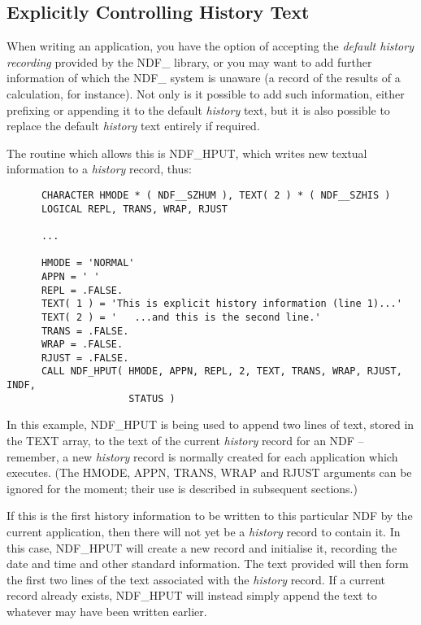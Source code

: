 \documentclass[twoside,11pt]{article}
\newcommand{\htmlref}[2]{#1}
\newcommand{\xlabel}[1]{}
\newcommand{\st}[1]{{\em{#1}}}
\begin{document}
\subsection{\xlabel{explicitly_controlling_history_text}\label{ss:controllinghistory}Explicitly Controlling History Text}

When writing an application, you have the option of accepting the
\st{default history recording\/} provided by the NDF\_ library, or you may
want to add further information of which the NDF\_ system is unaware
(a record of the results of a calculation, for instance).  Not only is
it possible to add such information, either prefixing or appending it
to the default \st{history\/} text, but it is also possible to replace the
default \st{history\/} text entirely if required.

The routine which allows this is \htmlref{NDF\_HPUT}{NDF_HPUT}, which writes new textual
information to a \st{history\/} record, thus:

\small
\begin{verbatim}
      CHARACTER HMODE * ( NDF__SZHUM ), TEXT( 2 ) * ( NDF__SZHIS )
      LOGICAL REPL, TRANS, WRAP, RJUST

      ...

      HMODE = 'NORMAL'
      APPN = ' '
      REPL = .FALSE.
      TEXT( 1 ) = 'This is explicit history information (line 1)...'
      TEXT( 2 ) = '   ...and this is the second line.'
      TRANS = .FALSE.
      WRAP = .FALSE.
      RJUST = .FALSE.
      CALL NDF_HPUT( HMODE, APPN, REPL, 2, TEXT, TRANS, WRAP, RJUST, INDF,
                     STATUS )
\end{verbatim}
\normalsize

In this example, NDF\_HPUT is being used to append two lines of text,
stored in the TEXT array, to the text of the current \st{history\/}
record for an NDF -- remember, a new \st{history\/} record is normally
created for each application which executes. (The HMODE, APPN, TRANS,
WRAP and RJUST arguments can be ignored for the moment; their use is
described in subsequent sections.)

If this is the first history information to be written to this
particular NDF by the current application, then there will not yet be
a \st{history\/} record to contain it. In this case, NDF\_HPUT will create a
new record and initialise it, recording the date and time and other
standard information. The text provided will then form the first two
lines of the text associated with the \st{history\/} record. If a current
record already exists, NDF\_HPUT will instead simply append the text
to whatever may have been written earlier.
\end{document}
